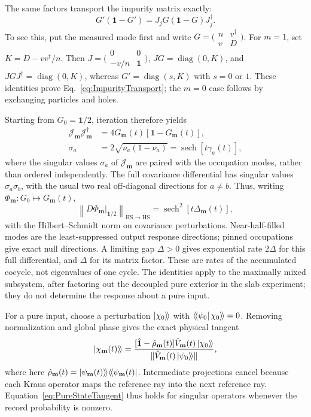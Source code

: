 \documentclass[aps,prb,10pt,twocolumn,superscriptaddress,longbibliography,floatfix]{revtex4-2}
\newcommand{\kett}[1]{\ket{#1}\!\rangle}
\newcommand{\braa}[1]{\langle\!\bra{#1}}
\newcommand{\rec}{\mathbf m}   %
\begin{document}
{The same factors transport the impurity matrix exactly:
\begin{equation}
 G'(\mathbf1-G')=J_jG(\mathbf1-G)J_j^\dagger.
 \label{eq:ImpurityTransport}
\end{equation}
To see this, put the measured mode first and write $G=\bigl(\begin{smallmatrix}n&v^\dagger\\v&D\end{smallmatrix}\bigr)$. For $m=1$, set $K=D-vv^\dagger/n$. Then $J=\bigl(\begin{smallmatrix}0&0\\-v/n&\mathbf1\end{smallmatrix}\bigr)$, $JG=\operatorname{diag}(0,K)$, and $JGJ^\dagger=\operatorname{diag}(0,K)$, whereas $G'=\operatorname{diag}(s,K)$ with $s=0$ or $1$. These identities prove Eq.~\eqref{eq:ImpurityTransport}; the $m=0$ case follows by exchanging particles and holes.

Starting from $G_0=\mathbf1/2$, iteration therefore yields
\begin{align}
 \mathcal J_{\rec}\mathcal J_{\rec}^\dagger
 &=4G_{\rec}(t)[\mathbf1-G_{\rec}(t)],\nonumber\\
 \sigma_a&=2\sqrt{\nu_a(1-\nu_a)}
 =\operatorname{sech}[t\gamma_a(t)],
 \label{eq:MaxmixTangentSpectrum}
\end{align}
where the singular values $\sigma_a$ of $\mathcal J_{\rec}$ are paired with the occupation modes, rather than ordered independently. The full covariance differential has singular values $\sigma_a\sigma_b$, with the usual two real off-diagonal directions for $a\ne b$. Thus, writing $\Phi_{\rec}:G_0\mapsto G_{\rec}(t)$,
\begin{equation}
 \left\|D\Phi_{\rec}\big|_{\mathbf1/2}\right\|_{\mathrm{HS}\to\mathrm{HS}}
 =\operatorname{sech}^{2}[t\Delta_{\rec}(t)],
 \label{eq:MaxmixTangentNorm}
\end{equation}
with the Hilbert--Schmidt norm on covariance perturbations. Near-half-filled modes are the least-suppressed output response directions; pinned occupations give exact null directions. A limiting gap $\Delta>0$ gives exponential rate $2\Delta$ for this full differential, and $\Delta$ for its matrix factor. These are rates of the accumulated cocycle, not eigenvalues of one cycle. The identities apply to the maximally mixed subsystem, after factoring out the decoupled pure exterior in the slab experiment; they do not determine the response about a pure input.

For a pure input, choose a perturbation $\kett{\chi_0}$ with $\braa{\psi_0}\chi_0\rangle\!\rangle=0$. Removing normalization and global phase gives the exact physical tangent
\begin{equation}
 \kett{\chi_{\rec}(t)}=
 \frac{[\hat{\mathbf1}-\hat\rho_{\rec}(t)]\hat V_{\rec}(t)\kett{\chi_0}}
 {\|\hat V_{\rec}(t)\kett{\psi_0}\|},
 \label{eq:PureStateTangent}
\end{equation}
where here $\hat\rho_{\rec}(t)=\kett{\psi_{\rec}(t)}\braa{\psi_{\rec}(t)}$. Intermediate projections cancel because each Kraus operator maps the reference ray into the next reference ray. Equation~\eqref{eq:PureStateTangent} thus holds for singular operators whenever the record probability is nonzero.

}
\end{document}
